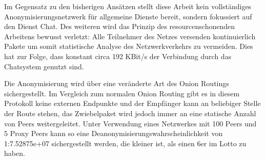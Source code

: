 \documentclass[9pt,a4paper]{article}
\begin{document}
Im Gegensatz zu den bisherigen Ansätzen stellt diese Arbeit kein vollständiges
Anonymisierungsnetzwerk für allgemeine Dienste bereit, sondern fokussiert auf
den Dienst Chat. Des weiteren wird das Prinzip des resourcenschonenden Arbeitens
bewusst verletzt: Alle Teilnehmer des Netzes versenden kontinuierlich Pakete
um somit statistische Analyse des Netzwerkverkehrs zu vermeiden. Dies hat zur
Folge, dass konstant circa 192 KBit/s der Verbindung durch das Chatsystem
genutzt sind.

Die Anonymisierung wird über eine veränderte Art des Onion Routings sichergestellt.
Im Vergleich zum normalen Onion Routing gibt es in diesem Protokoll keine
externen Endpunkte und der Empfänger kann an beliebiger Stelle der Route
stehen, das Zwiebelpaket wird jedoch immer an eine statische Anzahl von
Peers weitergeleitet. 
Unter Verwendung eines Netzwerkes mit 100 Peers und 5 Proxy Peers kann
so eine Deanonymisierungswahrscheinlichkeit von
1:7.52875e+07 sichergestellt werden, die kleiner ist, als einen 6er im Lotto
zu haben.
\end{document}
